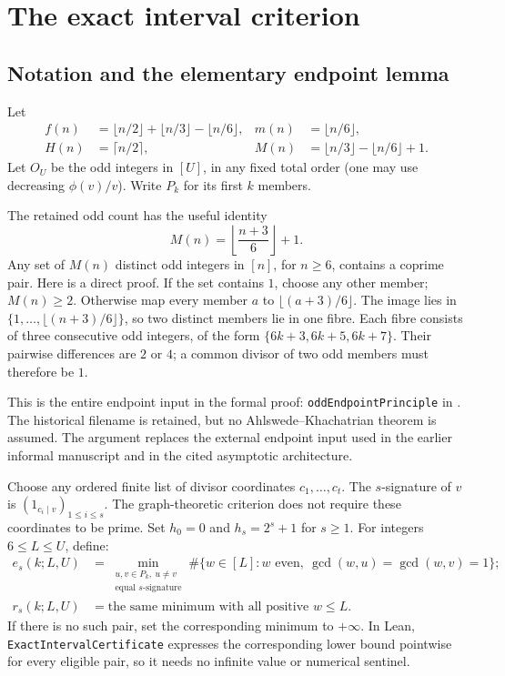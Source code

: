 \section{The exact interval criterion}\label{sec:criterion}

\subsection{Notation and the elementary endpoint lemma}
Let
\[
\begin{aligned}
f(n)&=\lfloor n/2\rfloor+\lfloor n/3\rfloor-\lfloor n/6\rfloor,
& m(n)&=\lfloor n/6\rfloor,\\
H(n)&=\lceil n/2\rceil,
& M(n)&=\lfloor n/3\rfloor-\lfloor n/6\rfloor+1.
\end{aligned}
\]
Let $O_U$ be the odd integers in $[U]$, in any fixed total order (one may use decreasing $\phi(v)/v$). Write $P_k$ for its first $k$ members.

The retained odd count has the useful identity
\[
 M(n)=\left\lfloor\frac{n+3}{6}\right\rfloor+1.
\]
Any set of $M(n)$ distinct odd integers in $[n]$, for $n\ge6$, contains a coprime pair. Here is a direct proof. If the set contains $1$, choose any other member; $M(n)\ge2$. Otherwise map every member $a$ to $\lfloor(a+3)/6\rfloor$. The image lies in $\{1,\ldots,\lfloor(n+3)/6\rfloor\}$, so two distinct members lie in one fibre. Each fibre consists of three consecutive odd integers, of the form $\{6k+3,6k+5,6k+7\}$. Their pairwise differences are $2$ or $4$; a common divisor of two odd members must therefore be $1$.

This is the entire endpoint input in the formal proof: \texttt{oddEndpointPrinciple} in . The historical filename is retained, but no Ahlswede--Khachatrian theorem is assumed. The argument replaces the external endpoint input used in the earlier informal manuscript and in the cited asymptotic architecture.

Choose any ordered finite list of divisor coordinates $c_1,\ldots,c_t$. The $s$-signature of $v$ is $(1_{c_i\mid v})_{1\le i\le s}$. The graph-theoretic criterion does not require these coordinates to be prime. Set $h_0=0$ and $h_s=2^s+1$ for $s\ge1$.
For integers $6\le L\le U$, define:
\[
\begin{aligned}
e_s(k;L,U)
&=\min_{\substack{u,v\in P_k,\ u\ne v\\\text{equal $s$-signature}}}
\#\{w\in[L]:w\text{ even},\ \gcd(w,u)=\gcd(w,v)=1\};\\
r_s(k;L,U)
&=\text{the same minimum with all positive }w\le L.
\end{aligned}
\]
If there is no such pair, set the corresponding minimum to $+\infty$. In Lean, \texttt{ExactIntervalCertificate} expresses the corresponding lower bound pointwise for every eligible pair, so it needs no infinite value or numerical sentinel.

